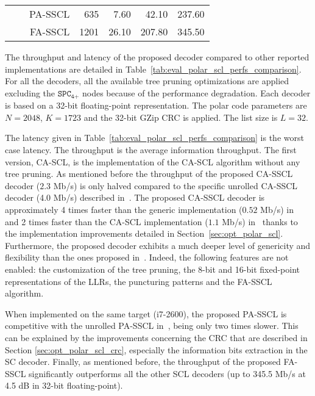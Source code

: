 \begin{table}[htp]
\begin{tabular}{r r r r r r r}
                                          &                                  & PA-SSCL                           &   635                             &  7.60           &  42.10          & 237.60          \\
                                          &                                  & FA-SSCL                           &  1201                             & 26.10           & 207.80          & 345.50          \\
  \end{tabular}
\end{table}

The throughput and latency of the proposed decoder compared to other reported
implementations are detailed in Table~\ref{tab:eval_polar_scl_perfs_comparison}.
For all the decoders, all the available tree pruning optimizations are applied
excluding the $\texttt{SPC}_\texttt{4+}$ nodes because of the performance
degradation. Each decoder is based on a 32-bit floating-point representation.
The polar code parameters are $N=2048$, $K=1723$ and the 32-bit GZip CRC is
applied. The list size is $L=32$.

The latency given in Table~\ref{tab:eval_polar_scl_perfs_comparison} is the
worst case latency. The throughput is the average information throughput. The
first version, CA-SCL, is the implementation of the CA-SCL algorithm without any
tree pruning. As mentioned before the throughput of the proposed CA-SSCL decoder
($2.3$ Mb/s) is only halved compared to the specific unrolled CA-SSCL decoder
(4.0 Mb/s) described in~\cite{Sarkis2016}. The proposed CA-SSCL decoder is
approximately 4 times faster than the generic implementation ($0.52$ Mb/s)
in~\cite{Sarkis2014b} and 2 times faster than the CA-SCL implementation
($1.1$ Mb/s) in~\cite{Shen2016}  thanks to the implementation improvements
detailed in Section~\ref{sec:opt_polar_scl}. Furthermore, the proposed decoder
exhibits a much deeper level of genericity and flexibility than the ones
proposed in~\cite{Sarkis2014,Shen2016}. Indeed, the following features are not
enabled: the customization of the tree pruning, the 8-bit and 16-bit fixed-point
representations of the LLRs, the puncturing patterns and the FA-SSCL algorithm.

When implemented on the same target (i7-2600), the proposed PA-SSCL is
competitive with the unrolled PA-SSCL in~\cite{Sarkis2016}, being only two times
slower. This can be explained by the improvements concerning the CRC that are
described in Section \ref{sec:opt_polar_scl_crc}, especially the information
bits extraction in the SC decoder. Finally, as mentioned before, the throughput
of the proposed FA-SSCL significantly outperforms all the other SCL decoders (up
to 345.5 Mb/s at 4.5 dB in 32-bit floating-point).

